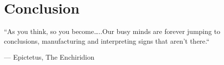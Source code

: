 \chapter{Conclusion}
\label{ch:conclusion}

\epigraph{``As you think, so you become…..Our busy minds are forever jumping to conclusions, manufacturing and interpreting signs that aren’t there.``}{--- \textup{Epictetus}, The Enchiridion}